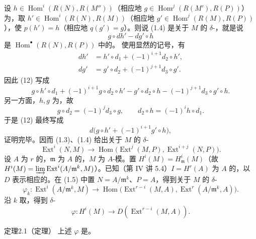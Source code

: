设 $h\in\operatorname{Hom}^i(R(N),R(M''))$（相应地 $g\in\operatorname{Hom}^j(R(M'),R(P))$）为，取 $h'\in\operatorname{Hom}^i(R(N),R(M))$（相应地 $g'\in\operatorname{Hom}^j(R(M),R(P))$），使 $p(h')=h$（相应地 $q(g')=g$）。则说 (1.4) 是关于 $M$ 的 $\delta$-，就是说
\[g\circ dh'-dg'\circ h\tag{12}\]
是 $\operatorname{Hom}^{\bullet}(R(N),R(P))$ 中的。
使用显然的记号，有
\[\begin{aligned}
dh'&=h'\circ d_1+(-1)^{i+1}d_2\circ h',\\
dg'&=g'\circ d_2+(-1)^{j+1}d_3\circ g'.
\end{aligned}\]
因此 (12) 写成
\[g\circ h'\circ d_1+(-1)^{i+1}g\circ d_2\circ h'-g'\circ d_2\circ h-(-1)^{j+1}d_3\circ g'\circ h.\]
另一方面，$h,g$ 为，故
\[g\circ d_2=(-1)^j d_3\circ g,\qquad d_2\circ h=(-1)^i h\circ d_1.\]
于是 (12) 最终写成
\[d\bigl(g\circ h'+(-1)^{i+1}g'\circ h\bigr),\]
证明完毕。因而 (1.3)、(1.4) 给出关于 $M$ 的 $\delta$-
\[\operatorname{Ext}^i(N,M)\longrightarrow\operatorname{Hom}\bigl(\operatorname{Ext}^j(M,P),\operatorname{Ext}^{i+j}(N,P)\bigr).\tag{1.5}\]
设 $A$ 为 $r$ 的，$\mathfrak m$ 为 $A$ 的，$M$ 为 $A$-模。置 $H^i(M)=H^i_{\mathfrak m}(M)$（故 $H^i(M)=\varinjlim\operatorname{Ext}^i(A/\mathfrak m^k,M)$）。已知（第 IV 讲 5.4）$I=H^r(A)$ 为 $A$ 的，以 $D$ 表示相应的。在 (1.5) 中置 $N=A/\mathfrak m^k$、$P=A$，得到关于 $M$ 的 $\delta$-
\[\varphi_k:\operatorname{Ext}^i(A/\mathfrak m^k,M)\longrightarrow\operatorname{Hom}\bigl(\operatorname{Ext}^{r-i}(M,A),\operatorname{Ext}^r(A/\mathfrak m^k,A)\bigr).\tag{13}\]
沿 $k$ 取，得到 $\delta$-
\[\varphi:H^i(M)\longrightarrow D(\operatorname{Ext}^{r-i}(M,A)).\tag{14}\]
\begin{SGAresult}{定理}{2.1（定理）}
上述 $\varphi$ 是。
\end{SGAresult}
